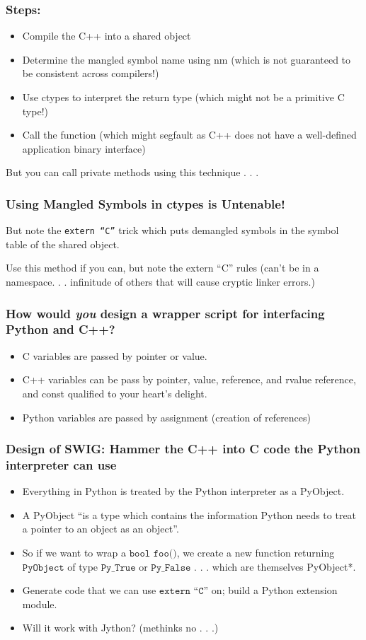 \documentclass{beamer}
\begin{document}
\begin{frame}[fragile]
  \frametitle{Steps:}
  \begin{itemize}
  \item Compile the C++ into a shared object
  \item Determine the mangled symbol name using nm (which is not guaranteed to be consistent across compilers!)
  \item Use ctypes to interpret the return type (which might not be a primitive C type!)
  \item Call the function (which might segfault as C++ does not have a well-defined application binary interface)
  \end{itemize}

  But you can call private methods using this technique . . .
\end{frame}


\begin{frame}
  \frametitle{Using Mangled Symbols in ctypes is Untenable!}
  But note the \texttt{extern ``C''} trick which puts demangled symbols in the symbol table of the shared object.

  Use this method if you can, but note the extern ``C'' rules (can't be in a namespace. . . infinitude of others that will cause cryptic linker errors.)
\end{frame}

\begin{frame}
  \frametitle{How would \emph{you} design a wrapper script for interfacing Python and C++?}
  \begin{itemize}
    \item C variables are passed by pointer or value.
    \item C++ variables can be pass by pointer, value, reference, and rvalue reference, and const qualified to your heart's delight.
    \item Python variables are passed by assignment (creation of references)
  \end{itemize}

\end{frame}

\begin{frame}[fragile]
  \frametitle{Design of SWIG: Hammer the C++ into C code the Python interpreter can use}
  \begin{itemize}
  \item Everything in Python is treated by the Python interpreter as a PyObject.
  \item A PyObject ``is a type which contains the information Python needs to treat a pointer to an object as an object''.
  \item So if we want to wrap a $\texttt{bool foo()}$, we create a new function returning $\texttt{PyObject}$ of type $\texttt{Py\_True}$ or $\texttt{Py\_False}$ . . . which are themselves PyObject*.
  \item Generate code that we can use $\texttt{extern ``C''}$ on; build a Python extension module.
  \item Will it work with Jython? (methinks no . . .)
  \end{itemize}
\end{frame}
\end{document}
